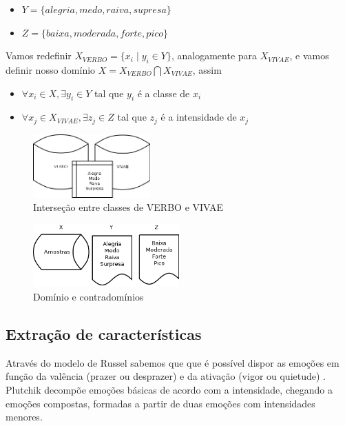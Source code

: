\begin{itemize}
    \item $Y = \{alegria, medo, raiva, supresa\}$
    \item $Z = \{baixa, moderada, forte, pico\}$
\end{itemize}

Vamos redefinir $X_{VERBO} = \{x_i \mid y_i \in Y\}$, analogamente para $X_{VIVAE}$, e vamos definir nosso domínio $X = X_{VERBO} \bigcap X_{VIVAE}$, assim

\begin{itemize}
    \item $\forall x_i \in X, \exists y_i \in Y$ tal que  $y_i$ é a classe de $x_i$
    \item $\forall x_j \in X_{VIVAE}, \exists z_j \in Z$ tal que  $z_j$ é a intensidade de $x_j$
\end{itemize}

\begin{figure}[!h]
\centering
\includegraphics[width=0.40\textwidth]{imagens/p-yverbointeryvivae.png}
\caption{\label{fig:yverbointeryvivae}Interseção entre classes de VERBO e VIVAE}
\end{figure}

\begin{figure}[!h]
\centering
\includegraphics[width=0.5\textwidth]{imagens/p-dominios-contradominos.png}
\caption{\label{fig:dominioscontradominios}Domínio e contradomínios}
\end{figure}

\subsection{Extração de características}

Através do modelo de Russel sabemos que que é possível dispor as emoções em função da valência (prazer ou desprazer) e da ativação (vigor ou quietude) \cite{27}. Plutchik decompõe emoções básicas de acordo com a intensidade, chegando a emoções compostas, formadas a partir de duas emoções com intensidades menores.

